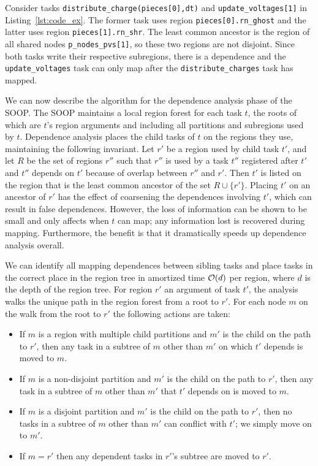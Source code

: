 Consider tasks {\tt distribute\_charge(pieces[0],dt)} and
{\tt update\_voltages[1]} in Listing~\ref{lst:code_ex}.  The former task
uses region {\tt pieces[0].rn\_ghost} and the latter uses region {\tt pieces[1].rn\_shr}.
The least common ancestor is the region of all shared nodes {\tt p\_nodes\_pvs[1]},
so these two regions are not disjoint.  Since both tasks write their respective subregions,
there is a dependence and the {\tt update\_voltages} task can only map after the
{\tt distribute\_charges} task has mapped.

We can now describe the algorithm for the dependence analysis phase of
the SOOP.  The SOOP maintains a local region forest for each task $t$,
the roots of which are $t$'s region arguments and including all
partitions and subregions used by $t$.  Dependence analysis
places the child tasks of $t$ on the regions they use, maintaining the
following invariant. Let $r'$ be a region used by child task $t'$,
and let $R$ be the set of regions $r''$ such that $r''$ is used
by a task $t''$ registered after $t'$ and $t''$ depends on $t'$
because of overlap between $r''$ and $r'$.  Then $t'$ is listed on the
region that is the least common ancestor of the set $R \cup \{r'\}$.
Placing $t'$ on an ancestor of $r'$ has the effect of coarsening the
dependences involving $t'$, which
can result in false dependences.  However, the loss of
information can be shown to be small and only affects when $t$ can
map; any information lost is recovered during mapping.
Furthermore, the benefit is that it dramatically speeds up
dependence analysis overall.

We can identify all mapping dependences between sibling tasks and place tasks
in the correct place in the region tree in amortized time ${\cal O}(d)$ per region,
where $d$ is the depth of the region tree.  For region $r'$ an argument of task $t'$, the analysis
walks the unique path in the region forest from a root to $r'$.  For each node $m$
on the walk from the root to $r'$ the following actions are taken:
\begin{itemize}
\item If $m$ is a region with multiple child partitions and $m'$ is the child on the
path to $r'$, then any task in a subtree of $m$ other than $m'$ on which $t'$ depends 
is moved to $m$.

\item If $m$ is a non-disjoint partition and $m'$ is the child on the
path to $r'$, then any task in a subtree of $m$ other than $m'$ that $t'$ depends on is
moved to $m$.

\item If $m$ is a disjoint partition and $m'$ is the child on the
path to $r'$, then no tasks in a subtree of $m$ other than $m'$ can conflict with $t'$; we simply move
on to $m'$.

\item If $m = r'$ then any dependent tasks in $r'$'s subtree are moved to $r'$.
\end{itemize}

